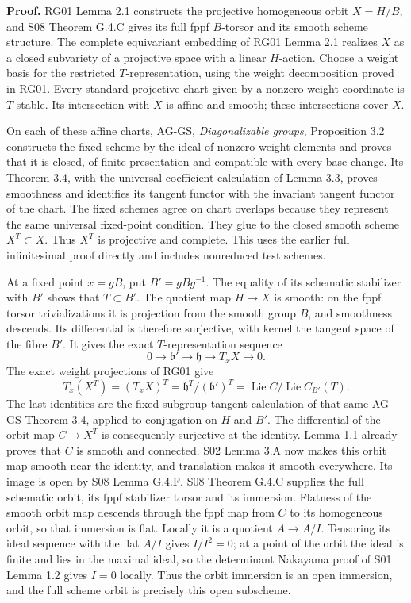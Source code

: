 \documentclass[11pt,a4paper,openany]{report}
\begin{document}
\textbf{Proof.} RG01 Lemma 2.1 constructs the projective homogeneous orbit \(X=H/B\), and S08 Theorem G.4.C gives its full fppf \(B\)-torsor and its smooth scheme structure. The complete equivariant embedding of RG01 Lemma 2.1 realizes \(X\) as a closed subvariety of a projective space with a linear \(H\)-action. Choose a weight basis for the restricted \(T\)-representation, using the weight decomposition proved in RG01. Every standard projective chart given by a nonzero weight coordinate is \(T\)-stable. Its intersection with \(X\) is affine and smooth; these intersections cover \(X\).

On each of these affine charts, AG-GS, \emph{Diagonalizable groups}, Proposition 3.2 constructs the fixed scheme by the ideal of nonzero-weight elements and proves that it is closed, of finite presentation and compatible with every base change. Its Theorem 3.4, with the universal coefficient calculation of Lemma 3.3, proves smoothness and identifies its tangent functor with the invariant tangent functor of the chart. The fixed schemes agree on chart overlaps because they represent the same universal fixed-point condition. They glue to the closed smooth scheme \(X^T\subset X\). Thus \(X^T\) is projective and complete. This uses the earlier full infinitesimal proof directly and includes nonreduced test schemes.

At a fixed point \(x=gB\), put \(B'=gBg^{-1}\). The equality of its schematic stabilizer with \(B'\) shows that \(T\subset B'\). The quotient map \(H\to X\) is smooth: on the fppf torsor trivializations it is projection from the smooth group \(B\), and smoothness descends. Its differential is therefore surjective, with kernel the tangent space of the fibre \(B'\). It gives the exact \(T\)-representation sequence \[
 0\longrightarrow\mathfrak b'\longrightarrow\mathfrak h
          \longrightarrow T_xX\longrightarrow0.
\] The exact weight projections of RG01 give \[
 T_x(X^T)=(T_xX)^T
       =\mathfrak h^T/(\mathfrak b')^T
       =\operatorname{Lie}C/\operatorname{Lie}C_{B'}(T).
\] The last identities are the fixed-subgroup tangent calculation of that same AG-GS Theorem 3.4, applied to conjugation on \(H\) and \(B'\). The differential of the orbit map \(C\to X^T\) is consequently surjective at the identity. Lemma 1.1 already proves that \(C\) is smooth and connected. S02 Lemma 3.A now makes this orbit map smooth near the identity, and translation makes it smooth everywhere. Its image is open by S08 Lemma G.4.F. S08 Theorem G.4.C supplies the full schematic orbit, its fppf stabilizer torsor and its immersion. Flatness of the smooth orbit map descends through the fppf map from \(C\) to its homogeneous orbit, so that immersion is flat. Locally it is a quotient \(A\to A/I\). Tensoring its ideal sequence with the flat \(A/I\) gives \(I/I^2=0\); at a point of the orbit the ideal is finite and lies in the maximal ideal, so the determinant Nakayama proof of S01 Lemma 1.2 gives \(I=0\) locally. Thus the orbit immersion is an open immersion, and the full scheme orbit is precisely this open subscheme.
\end{document}
